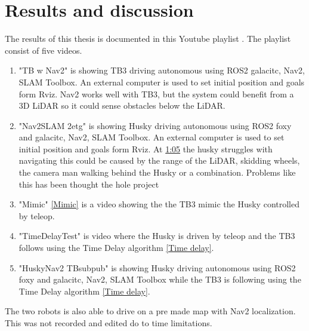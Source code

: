 \chapter{Results and discussion}


The results of this thesis is documented in this Youtube playlist \cite{youtube_playlist_results}. The playlist consist of five videos. 
\begin{enumerate}
    \item "TB w Nav2" is showing TB3 driving autonomous using ROS2 galacitc, Nav2, SLAM Toolbox. An external computer is used to set initial position and goals form Rviz. Nav2 works well with TB3, but the system could benefit from a 3D LiDAR so it could sense obstacles below the LiDAR. 
    

    \item "Nav2SLAM 2etg" \label{Nav2SLAM 2etg} is showing Husky driving autonomous using ROS2 foxy and galacitc, Nav2, SLAM Toolbox. An external computer is used to set initial position and goals form Rviz. 
    At \href{https://youtu.be/JiTbKtXq_GY?t=65}{1:05} the husky struggles with navigating this could be caused by the range of the LiDAR, skidding wheels, the camera man walking behind the Husky or a combination. Problems like this has been thought the hole project 

    \item "Mimic" \ref{Mimic} is a video showing the the TB3 mimic the Husky controlled by teleop. 
    
    \item "TimeDelayTest" is video where the Husky is driven by teleop and the TB3 follows using the Time Delay algorithm \ref{Time delay}. 
    
    \item "HuskyNav2 TBsubpub" is showing Husky driving autonomous using ROS2 foxy and galacitc, Nav2, SLAM Toolbox while the TB3 is following using the Time Delay algorithm \ref{Time delay}. 
\end{enumerate}
The two robots is also able to drive on a pre made map with Nav2 localization. This was not recorded and edited do to time limitations. 


